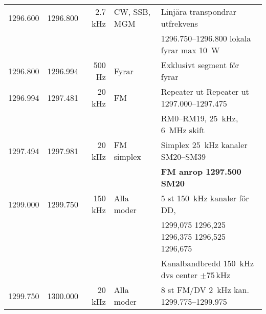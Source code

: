 \begin{tabular}{rrrll}
1296.600 & 1296.800 & 2.7 kHz & CW, SSB, MGM & Linjära transpondrar utfrekvens                      \\
	     &          &         &              & \numrange{1296,750}{1296,800} lokala fyrar max \SI{10}{W}             \\ \hline
1296.800 & 1296.994 & 500 Hz  & Fyrar        & Exklusivt segment för fyrar                          \\ \hline
1296.994 & 1297.481 & 20 kHz  & FM           & Repeater ut Repeater ut \numrange{1297,000}{1297,475}           \\
	     &          &         &              & RM0--RM19, \SI{25}{kHz}, \SI{6}{MHz} skift                      \\ \hline
1297.494 & 1297.981 & 20 kHz  & FM simplex   & Simplex \SI{25}{kHz} kanaler SM20--SM39                      \\
	     &          &         &              & \textbf{FM anrop \num{1297,500} SM20}                      \\ \hline
1299.000 & 1299.750 & 150 kHz & Alla moder   & 5 st \SI{150}{kHz} kanaler för DD,                         \\
	     &          &         &              & 1299,075 1296,225 1296,375  1296,525 1296,675        \\
	     &          &         &              & Kanalbandbredd \SI{150}{kHz} dvs center $\pm$75\,kHz        \\ \hline
1299.750 & 1300.000 & 20 kHz  & Alla moder   & 8 st FM/DV \SI{2}{kHz} kan. \numrange{1299,775}{1299.975}
\end{tabular}

\clearpage

\twocolumn
